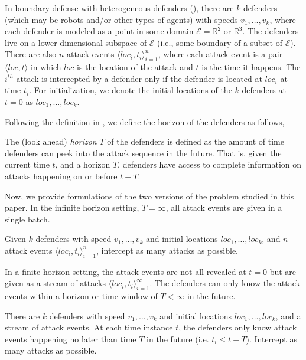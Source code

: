 In boundary defense with heterogeneous defenders (\prob), there are $k$ defenders (which may be robots and/or other types of agents) with speeds $v_1,\dots,v_k$, where each defender is modeled as a point in some domain $\mathcal E = \mathbb R^2$ or $\mathbb R^3$.
The defenders live on a lower dimensional subspace of $\mathcal E$ (i.e., some boundary of a subset of $\mathcal E$).  
There are also $n$ attack events $\big\langle loc_i, t_i\big\rangle_{i=1}^{n}$, where each attack event is a pair $\big\langle loc, t\big\rangle$ in which $loc$ is the
location of the attack and $t$ is the time it happens. 
The $i^{{th}}$ attack is intercepted by a defender only if the defender is located at $loc_i$ at time $t_i$.
For initialization, we denote the initial locations of the $k$ defenders at $t=0$ as $loc_{1},\dots, loc_{k}$. 

Following the definition in \cite{adler2022role}, we define the horizon of the defenders as follows,
\begin{definition}[Horizon]
The (look ahead) \textit{horizon} $T$ of the defenders is defined as the amount of time defenders can peek into the attack sequence in the future. That is, given the current time $t$, and a horizon $T$, defenders have access to complete information on attacks happening on or before $t+T$. 
\end{definition}

Now, we provide formulations of the two versions of the \prob problem studied in this paper. In the infinite horizon setting, $T = \infty$, all attack events are given in a single batch.

\begin{problem}\label{prob:bd-1}
Given $k$ defenders with speed $v_1, \dots, v_k$ and initial locations $loc_1, \ldots, loc_k$, and $n$ attack events $\big\langle loc_i, t_i\big\rangle_{i=1}^{n}$, intercept as many attacks as possible. 
\end{problem}

In a finite-horizon setting, the attack events are not all revealed at $t=0$ but are given as a stream of attacks $\big\langle loc_i, t_i\big\rangle_{i=1}^{\infty}$. The defenders can only know the attack events within a horizon or time window of $T < \infty$ in the future.

\begin{problem}\label{prob:bd-2}
There are $k$ defenders with speed $v_1, \dots, v_k$ and initial locations $loc_1, \ldots, loc_k$, and a stream of attack events.
%
At each time instance $t$, the defenders only know attack events happening no later than time $T$ in the future (i.e. $t_i \le t+T$).
%
Intercept as many attacks as possible. 
\end{problem}

